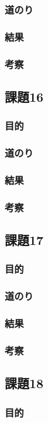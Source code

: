 \documentclass[a4paper]{jarticle}
\begin{document}
\subsubsection{道のり}
\subsubsection{結果}
\subsubsection{考察}
\subsection{課題16}
\subsubsection{目的}
\subsubsection{道のり}
\subsubsection{結果}
\subsubsection{考察}
\subsection{課題17}
\subsubsection{目的}
\subsubsection{道のり}
\subsubsection{結果}
\subsubsection{考察}
\subsection{課題18}
\subsubsection{目的}
\end{document}
